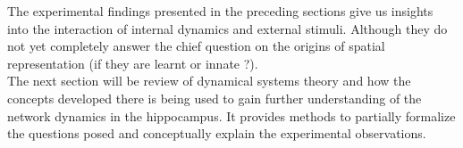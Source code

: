 The experimental findings presented in the preceding sections give us insights into the interaction of internal dynamics and external stimuli. Although they do not yet completely answer the chief question on the origins of spatial representation (if they are learnt or innate ?). \\
The next section will be review of dynamical systems theory and how the concepts developed there is being used to gain further understanding of the network dynamics in the hippocampus. It provides methods to partially formalize the questions posed and conceptually explain the experimental observations. 






